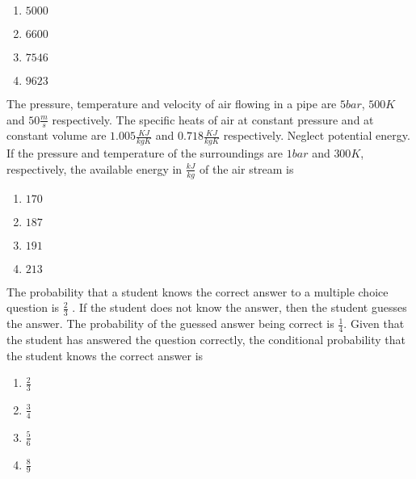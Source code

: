     \begin{multicols}{4}
        \begin{enumerate}
            \item $5000$
            \item $6600$
            \item $7546$
            \item $9623$
        \end{enumerate}
    \end{multicols}

    \item 
    The pressure, temperature and velocity of air flowing in a pipe are $5 bar$, $500 K$ and $50 \frac{m}{s}$ respectively. The specific heats of air at constant pressure and at constant volume are $1.005 \frac{KJ}{kgK}$ and $0.718 \frac{KJ}{kgK}$ respectively. Neglect potential energy. If the pressure and temperature of the surroundings are $1 bar$ and $300 K$, respectively, the available energy in $\frac{kJ}{kg}$ of the air stream is
    \hfill{}

    \begin{multicols}{4}
        \begin{enumerate}
            \item $170$
            \item $187$
            \item $191$
            \item $213$
        \end{enumerate}
    \end{multicols}

    \item
    The probability that a student knows the correct answer to a multiple choice question is $\frac{2}{3}$ . If the student does not know the answer, then the student guesses the answer. The probability of the guessed answer being correct is $\frac{1}{4}$. Given that the student has answered the question correctly, the conditional probability that the student knows the correct answer is
    \hfill{}

    \begin{multicols}{4}
        \begin{enumerate}
            \item $\frac{2}{3}$
            \item $\frac{3}{4}$
            \item $\frac{5}{6}$
            \item $\frac{8}{9}$
        \end{enumerate}
    \end{multicols}

